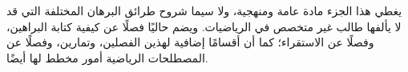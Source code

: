 \documentclass[../../include/open-logic-part]{subfiles}
\begin{document}

\begin{editorial}
  يغطي هذا الجزء مادة عامة ومنهجية، ولا سيما شروح طرائق البرهان
  المختلفة التي قد لا يألفها طالب غير متخصص في الرياضيات. ويضم حاليًا
  فصلًا عن كيفية كتابة البراهين، وفصلًا عن الاستقراء؛ كما أن أقسامًا
  إضافية لهذين الفصلين، وتمارين، وفصلًا عن المصطلحات الرياضية أمور
  مخطط لها أيضًا.
\end{editorial}



\OLEndPartHook
\end{document}

